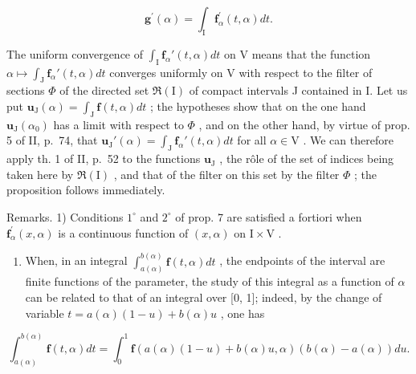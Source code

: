 \[
\mathbf {g} ^ {\prime} (\alpha) = \int_ {\mathrm{I}} \mathbf {f} _ {\alpha} ^ {\prime} (t, \alpha) d t.\tag{14}
\]

The uniform convergence of \(\int_{\mathrm{I}} \mathbf{f}_{\alpha}'(t, \alpha) dt\) on V means that the function \(\alpha \mapsto \int_{\mathrm{J}} \mathbf{f}_{\alpha}'(t, \alpha) dt\) converges uniformly on V with respect to the filter of sections \(\Phi\) of the directed set \(\Re(\mathrm{I})\) of compact intervals J contained in I. Let us put \(\mathbf{u}_{\mathrm{J}}(\alpha) = \int_{\mathrm{J}} \mathbf{f}(t, \alpha) dt\) ; the hypotheses show that on the one hand \(\mathbf{u}_{\mathrm{J}}(\alpha_0)\) has a limit with respect to \(\Phi\) , and on the other hand, by virtue of prop. 5 of II, p.~74, that \(\mathbf{u}_{\mathrm{J}}'(\alpha) = \int_{\mathrm{J}} \mathbf{f}_{\alpha}'(t, \alpha) dt\) for all \(\alpha \in \mathrm{V}\) . We can therefore apply th. 1 of II, p.~52 to the functions \(\mathbf{u}_{\mathrm{J}}\) , the rôle of the set of indices being taken here by \(\Re(\mathrm{I})\) , and that of the filter on this set by the filter \(\Phi\) ; the proposition follows immediately.

Remarks. 1) Conditions \(1^{\circ}\) and \(2^{\circ}\) of prop. 7 are satisfied a fortiori when \(\mathbf{f}_{\alpha}^{\prime}(x,\alpha)\) is a continuous function of \((x,\alpha)\) on \(\mathrm{I} \times \mathrm{V}\) .

\begin{enumerate}
\def\labelenumi{\arabic{enumi})}
\setcounter{enumi}{1}
\tightlist
\item
  When, in an integral \(\int_{a(\alpha)}^{b(\alpha)}\mathbf{f}(t,\alpha)dt\) , the endpoints of the interval are finite functions of the parameter, the study of this integral as a function of \(\alpha\) can be related to that of an integral over {[}0, 1{]}; indeed, by the change of variable \(t = a(\alpha)(1 - u) + b(\alpha)u\) , one has
\end{enumerate}

\[
\int_ {a (\alpha)} ^ {b (\alpha)} \mathbf {f} (t, \alpha) d t = \int_ {0} ^ {1} \mathbf {f} (a (\alpha) (1 - u) + b (\alpha) u, \alpha) (b (\alpha) - a (\alpha)) d u.
\]

